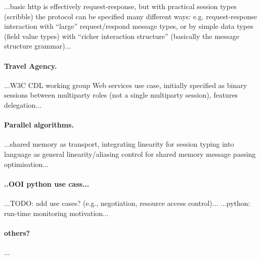 ...basic http is effectively request-response, but with practical session types (scribble) the protocol can be specified many different ways: e.g. request-response interaction with ``large'' request/respond message types, or by simple data types (field value types) with ``richer interaction structure'' (basically the message structure grammar)...


\paragraph{Travel Agency.}

...W3C CDL working group Web services use case, initially specified as binary sessions between multiparty roles (not a single multiparty session), features delegation...


\paragraph{Parallel algorithms.}

...shared memory as transport, integrating linearity for session typing into language as general linearity/aliasing control for shared memory message passing optimisation...


\paragraph{..OOI python use cass...}

...TODO: add use cases? (e.g., negotiation, resource access control)... ...python: run-time monitoring motivation...


\paragraph{others?}

...

